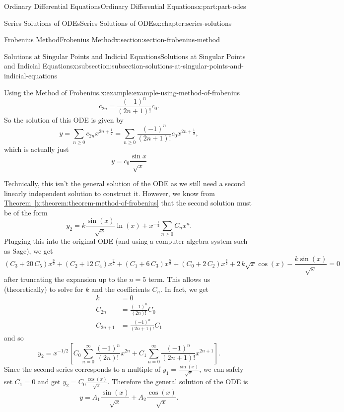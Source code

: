 \documentclass[oneside,10pt,]{book}
\newcommand{\xreffont}{\relax}
\numberwithin{equation}{part}
\newcommand{\amp}{&}
\begin{document}
\begin{partptx}{Ordinary Differential Equations}{}{Ordinary Differential Equations}{}{}{x:part:part-odes}
\begin{chapterptx}{Series Solutions of ODEs}{}{Series Solutions of ODEs}{}{}{x:chapter:series-solutions}
\begin{sectionptx}{Frobenius Method}{}{Frobenius Method}{}{}{x:section:section-frobenius-method}
\begin{subsectionptx}{Solutions at Singular Points and Indicial Equations}{}{Solutions at Singular Points and Indicial Equations}{}{}{x:subsection:subsection-solutions-at-singular-points-and-indicial-equations}
\begin{example}{Using the Method of Frobenius.}{x:example:example-using-method-of-frobenius}
\begin{equation*}
c_{2n} = \frac{(-1)^{n}}{(2n+1)!}c_{0}.
\end{equation*}
So the solution of this ODE is given by%
\begin{equation*}
y = \sum_{n\geq0}c_{2n}x^{2n+\frac{1}{2}} = \sum_{n\geq0}\frac{(-1)^{n}}{(2n+1)!}c_{0}x^{2n+\frac{1}{2}},
\end{equation*}
which is actually just%
\begin{equation*}
y = c_{0}\frac{\sin x}{\sqrt{x}}
\end{equation*}
%
\par
Technically, this isn't the general solution of the ODE as we still need a second linearly independent solution to construct it. However, we know from \hyperref[x:theorem:theorem-method-of-frobenius]{Theorem~{\xreffont\ref{x:theorem:theorem-method-of-frobenius}}} that the second solution must be of the form%
\begin{equation*}
y_2 = k\frac{\sin(x)}{\sqrt{x}}\ln(x) + x^{-\frac{1}{2}}\sum_{n\geq0}C_n x^n.
\end{equation*}
Plugging this into the original ODE (and using a computer algebra system such as Sage), we get%
\begin{equation*}
{\left(C_{3} + 20 \, C_{5}\right)} x^{\frac{9}{2}} + {\left(C_{2} + 12 \, C_{4}\right)} x^{\frac{7}{2}} + {\left(C_{1} + 6 \, C_{3}\right)} x^{\frac{5}{2}} + {\left(C_{0} + 2 \, C_{2}\right)} x^{\frac{3}{2}} + 2 \, k \sqrt{x} \cos\left(x\right) - \frac{k \sin\left(x\right)}{\sqrt{x}} = 0
\end{equation*}
after truncating the expansion up to the \(n=5\) term. This allows us (theoretically) to solve for \(k\) and the coefficients \(C_n\). In fact, we get%
\begin{align*}
k \amp= 0\\
C_{2n} \amp= \frac{(-1)^n}{(2n)!}C_0\\
C_{2n+1} \amp= \frac{(-1)^n}{(2n+1)!}C_1
\end{align*}
and so%
\begin{equation*}
y_2 = x^{-1/2}\left[C_0\sum_{n=0}^{\infty}\frac{(-1)^n}{(2n)!}x^{2n} + C_1 \sum_{n=0}^{\infty}\frac{(-1)^n}{(2n+1)!}x^{2n+1}\right].
\end{equation*}
Since the second series corresponds to a multiple of \(y_1 = \frac{\sin(x)}{\sqrt{x}}\), we can safely set \(C_1 = 0\) and get \(y_2 = C_0\frac{\cos(x)}{\sqrt{x}}\). Therefore the general solution of the ODE is%
\begin{equation*}
y = A_1\frac{\sin(x)}{\sqrt{x}} + A_{2}\frac{\cos(x)}{\sqrt{x}}.
\end{equation*}

\end{example}
\end{subsectionptx}
\end{sectionptx}
\end{chapterptx}
\end{partptx}
\end{document}
